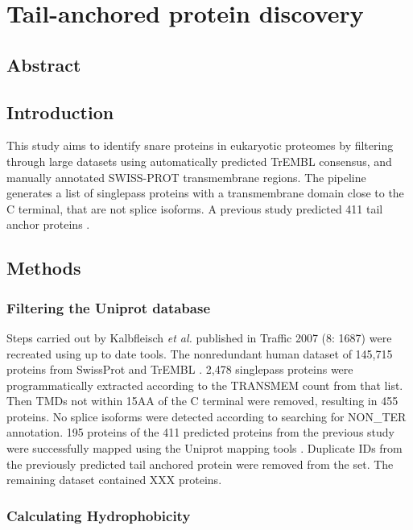 \chapter{Tail-anchored protein discovery} %
\section{Abstract}

\section{Introduction}
This study aims to identify \gls{snare} proteins in eukaryotic proteomes by filtering through large datasets using automatically predicted TrEMBL consensus, and manually annotated SWISS-PROT transmembrane regions. The pipeline generates a list of singlepass proteins with a transmembrane domain close to the C terminal, that are not splice isoforms. A previous study predicted 411 tail anchor proteins \cite{Kalbfleisch2007}.

\section{Methods}

\subsection{Filtering the Uniprot database}
Steps carried out by Kalbfleisch {\it et al.} published in Traffic 2007 (8: 1687) were recreated using up to date tools. The non\-redundant human dataset of 145,715 proteins from SwissProt and TrEMBL \cite{Kalbfleisch2007, TheUniProtConsortium2014}. 2,478 singlepass proteins were programmatically extracted according to the TRANSMEM count from that list. Then TMDs not within 15AA of the C terminal were removed, resulting in 455 proteins. No splice isoforms were detected according to searching for NON\_TER annotation. 195 proteins of the 411 predicted proteins from the previous study were successfully mapped using the Uniprot mapping tools \cite{TheUniProtConsortium2014}. Duplicate IDs from the previously predicted tail anchored protein were removed from the set. The remaining dataset contained XXX proteins.

\subsection{Calculating Hydrophobicity}

